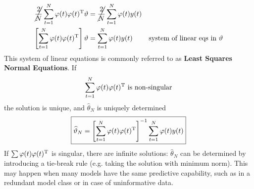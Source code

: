 \begin{align*}
\cancel{\frac{2}{N}}\sum _{t=1}^{N} \varphi (t) \varphi (t)^{\mathrm{T}} \vartheta  & =\cancel{\frac{2}{N}}\sum _{t=1}^{N} \varphi (t) y(t) & \\
\left[\sum _{t=1}^{N} \varphi (t) \varphi (t)^{\mathrm{T}}\right] \vartheta  & =\sum _{t=1}^{N} \varphi (t) y(t) & \text{system of linear eqs in} \ \vartheta 
\end{align*}
This system of linear equations is commonly referred to as \textbf{Least Squares Normal Equations}. If 
\begin{equation*}
\sum _{t=1}^{N} \varphi (t) \varphi (t)^{\mathrm{T}} \ \text{is non-singular}
\end{equation*}
the solution is unique, and $ \hat{\theta }_{N}$ is uniquely determined
\begin{equation*}
\boxed{\widehat{\vartheta }_{N} =\left[\sum _{t=1}^{N} \varphi (t) \varphi (t)^{\mathrm{T}}\right]^{-1}\sum _{t=1}^{N} \varphi (t) y(t)}
\end{equation*}
If $ \sum \varphi (t) \varphi (t)^{\mathrm{T}}$ is singular, there are infinite solutions: $ \hat{\theta }_{N}$ can be determined by introducing a tie-break rule (e.g. taking the solution with minimum norm). This may happen when many models have the same predictive capability, such as in a redundant model class or in case of uninformative data.

